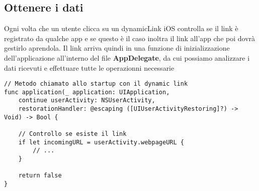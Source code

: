 \subsection{Ottenere i dati}

Ogni volta che un utente clicca su un dynamicLink iOS controlla
se il link è registrato da qualche app e se questo è il caso
inoltra il link all'app che poi dovrà gestirlo aprendola. 
Il link arriva quindi in una funzione di inizializzazione dell'applicazione all'interno del
file \textbf{AppDelegate}, da cui possiamo analizzare i dati ricevuti e effettuare tutte le operazionni necessarie

\begin{verbatim}
// Metodo chiamato allo startup con il dynamic link
func application(_ application: UIApplication,
    continue userActivity: NSUserActivity,
    restorationHandler: @escaping ([UIUserActivityRestoring]?) -> Void) -> Bool {
        
    // Controllo se esiste il link
    if let incomingURL = userActivity.webpageURL {
        // ...
    }
    
    return false
}
\end{verbatim}